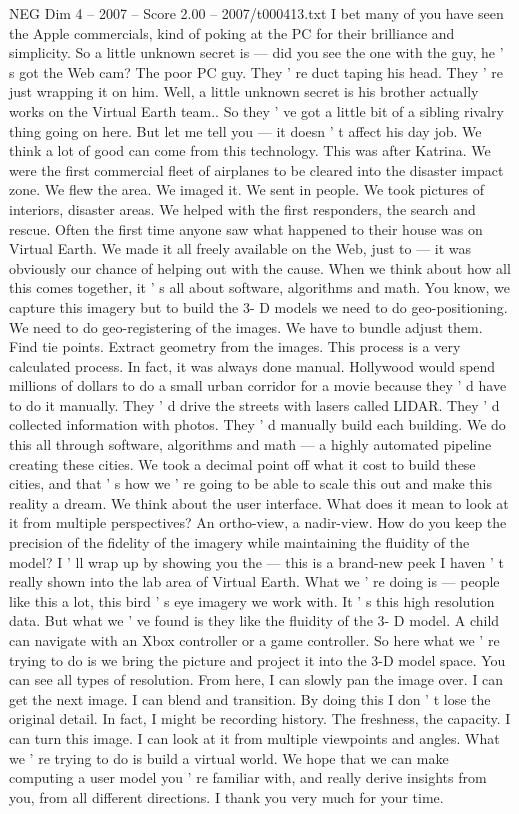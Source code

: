 \begin{textsample}{NEG Dim 4 – 2007 – Score 2.00 – 2007/t000413.txt}
I bet many of you have seen the Apple commercials, kind of poking at the PC for their brilliance and simplicity.
So a little unknown secret is — did you see the one with the guy, he ' s got the Web cam?
The poor PC guy.
They ' re duct taping his head.
They ' re just wrapping it on him.
Well, a little unknown secret is his brother actually works on the Virtual Earth team..
So they ' ve got a little bit of a sibling rivalry thing going on here.
But let me tell you — it doesn ' t affect his day job.
We think a lot of good can come from this technology.
This was after Katrina.
We were the first commercial fleet of airplanes to be cleared into the disaster impact zone.
We flew the area.
We imaged it.
We sent in people.
We took pictures of interiors, disaster areas.
We helped with the first responders, the search and rescue.
Often the first time anyone saw what happened to their house was on Virtual Earth.
We made it all freely available on the Web, just to — it was obviously our chance of helping out with the cause.
When we think about how all this comes together, it ' s all about software, algorithms and math.
You know, we capture this imagery but to build the 3- D models we need to do geo-positioning.
We need to do geo-registering of the images.
We have to bundle adjust them.
Find tie points.
Extract geometry from the images.
This process is a very calculated process.
In fact, it was always done manual.
Hollywood would spend millions of dollars to do a small urban corridor for a movie because they ' d have to do it manually.
They ' d drive the streets with lasers called LIDAR.
They ' d collected information with photos.
They ' d manually build each building.
We do this all through software, algorithms and math — a highly automated pipeline creating these cities.
We took a decimal point off what it cost to build these cities, and that ' s how we ' re going to be able to scale this out and make this reality a dream.
We think about the user interface.
What does it mean to look at it from multiple perspectives?
An ortho-view, a nadir-view.
How do you keep the precision of the fidelity of the imagery while maintaining the fluidity of the model?
I ' ll wrap up by showing you the — this is a brand-new peek I haven ' t really shown into the lab area of Virtual Earth.
What we ' re doing is — people like this a lot, this bird ' s eye imagery we work with.
It ' s this high resolution data.
But what we ' ve found is they like the fluidity of the 3- D model.
A child can navigate with an Xbox controller or a game controller.
So here what we ' re trying to do is we bring the picture and project it into the 3-D model space.
You can see all types of resolution.
From here, I can slowly pan the image over.
I can get the next image.
I can blend and transition.
By doing this I don ' t lose the original detail.
In fact, I might be recording history.
The freshness, the capacity.
I can turn this image.
I can look at it from multiple viewpoints and angles.
What we ' re trying to do is build a virtual world.
We hope that we can make computing a user model you ' re familiar with, and really derive insights from you, from all different directions.
I thank you very much for your time.

\end{textsample}
